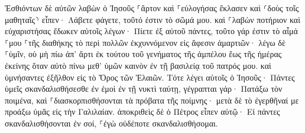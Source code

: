 \documentclass{openreader}
\begin{document}
Ἐσθιόντων δὲ αὐτῶν λαβὼν ὁ Ἰησοῦς ⸀ἄρτον καὶ ⸀εὐλογήσας ἔκλασεν καὶ ⸂δοὺς τοῖς μαθηταῖς⸃ εἶπεν· Λάβετε φάγετε, τοῦτό ἐστιν τὸ σῶμά μου. 
καὶ ⸀λαβὼν ποτήριον καὶ εὐχαριστήσας ἔδωκεν αὐτοῖς λέγων· Πίετε ἐξ αὐτοῦ πάντες, 
τοῦτο γάρ ἐστιν τὸ αἷμά ⸀μου ⸀τῆς διαθήκης τὸ περὶ πολλῶν ἐκχυννόμενον εἰς ἄφεσιν ἁμαρτιῶν· 
λέγω δὲ ⸀ὑμῖν, οὐ μὴ πίω ἀπ’ ἄρτι ἐκ τούτου τοῦ γενήματος τῆς ἀμπέλου ἕως τῆς ἡμέρας ἐκείνης ὅταν αὐτὸ πίνω μεθ’ ὑμῶν καινὸν ἐν τῇ βασιλείᾳ τοῦ πατρός μου. 
καὶ ὑμνήσαντες ἐξῆλθον εἰς τὸ Ὄρος τῶν Ἐλαιῶν. 
Τότε λέγει αὐτοῖς ὁ Ἰησοῦς· Πάντες ὑμεῖς σκανδαλισθήσεσθε ἐν ἐμοὶ ἐν τῇ νυκτὶ ταύτῃ, γέγραπται γάρ· Πατάξω τὸν ποιμένα, καὶ ⸀διασκορπισθήσονται τὰ πρόβατα τῆς ποίμνης· 
μετὰ δὲ τὸ ἐγερθῆναί με προάξω ὑμᾶς εἰς τὴν Γαλιλαίαν. 
ἀποκριθεὶς δὲ ὁ Πέτρος εἶπεν αὐτῷ· Εἰ πάντες σκανδαλισθήσονται ἐν σοί, ⸀ἐγὼ οὐδέποτε σκανδαλισθήσομαι. 
\end{document}
